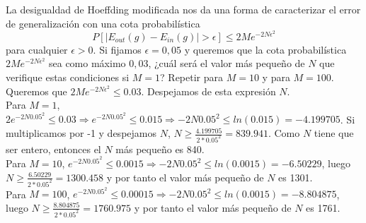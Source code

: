 \documentclass[12pt]{article}
\theoremstyle{definition}
\begin{document}
\begin{pregunta}
\begin{enumerate}
\end{enumerate}
\end{pregunta}

\begin{pregunta}
La desigualdad de Hoeffding modificada nos da una forma de caracterizar el error de generalización con una cota probabilística
\begin{equation}
P[|E_{out}(g) - E_{in}(g)| > \epsilon] \leqslant 2Me^{-2N \epsilon^2}
\end{equation}
para cualquier $\epsilon > 0$. Si fijamos $\epsilon=0,05$ y queremos que la cota probabilística $2Me^{-2N \epsilon^2}$ sea como máximo $0,03$, ¿cuál será el valor más pequeño de $N$ que verifique estas condiciones si $M=1$? Repetir para $M=10$ y para $M=100$.\\

Queremos que $2Me^{-2N \epsilon^2} \leq 0.03$. Despejamos de esta expresión $N$.\\

Para $M=1$, $2e^{-2N0.05^2} \leq 0.03 \Rightarrow e^{-2N0.05^2} \leq 0.015 \Rightarrow -2N0.05^2 \leq ln(0.015) = -4.199705$. Si multiplicamos por -1 y despejamos $N$, $N \geq \frac{4.199705}{2*0.05^2} = 839.941$. Como $N$ tiene que ser entero, entonces el $N$ más pequeño es 840.\\

Para $M=10$, $e^{-2N0.05^2} \leq 0.0015 \Rightarrow -2N0.05^2 \leq ln(0.0015) = -6.50229$, luego $N \geq \frac{6.50229}{2*0.05^2} = 1300.458$ y por tanto el valor más pequeño de $N$ es 1301.\\

Para $M=100$, $e^{-2N0.05^2} \leq 0.00015 \Rightarrow -2N0.05^2 \leq ln(0.0015) = -8.804875$, luego $N \geq \frac{8.804875}{2*0.05^2} = 1760.975$ y por tanto el valor más pequeño de $N$ es 1761.
\end{pregunta}
\end{document}
